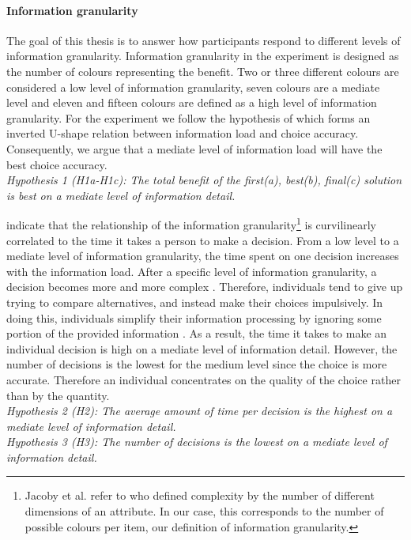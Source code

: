 \paragraph{Information granularity}
The goal of this thesis is to answer how participants respond to different levels of information granularity.
Information granularity in the experiment is designed as the number of colours representing the benefit. Two or three different colours are considered a low level of information granularity, seven colours are a mediate level and eleven and fifteen colours are defined as a high level of information granularity.
For the experiment we follow the hypothesis of \cite{Jacoby1974} which forms an inverted U-shape relation between information load and choice accuracy. Consequently, we argue that a mediate level of information load will have the best choice accuracy.\\
\textit{Hypothesis 1 (H1a-H1c): The total benefit of the first(a), best(b), final(c) solution is best on a mediate level of information detail.}

\cite{Jacoby1974} indicate that the relationship of the information granularity\footnote{Jacoby et al. refer to \cite{Hendrick1968} who defined complexity by the number of different dimensions of an attribute. In our case, this corresponds to the number of possible colours per item, our definition of information granularity. }  is curvilinearly correlated to the time it takes a person to make a decision. From a low level to a mediate level of information granularity, the time spent on one decision increases with the information load. After a specific level of information granularity, a decision becomes more and more complex \citep{Hendrick1968}. Therefore, individuals tend to give up trying to compare alternatives, and instead make their choices impulsively. In doing this, individuals simplify their information processing by ignoring some portion of the provided information \citep{Malhotra1982}.
As a result, the time it takes to make an individual decision is high on a mediate level of information detail. However, the number of decisions is the lowest for the medium level since the choice is more accurate. Therefore an individual concentrates on the quality of the choice rather than by the quantity.\\ 
\textit{Hypothesis 2 (H2): The average amount of time per decision is the highest on a mediate level of information detail.}\\
\textit{Hypothesis 3 (H3): The number of decisions is the lowest on a mediate level of information detail.}\\

